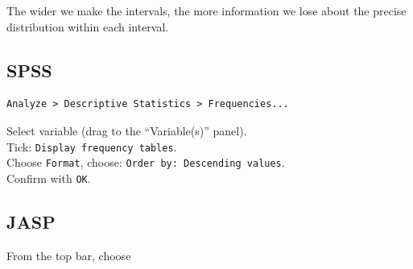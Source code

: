 \documentclass[
]{book}
\begin{document}
The wider we make the intervals, the more information we lose
about the precise distribution within each interval.

\hypertarget{spss-1}{%
\subsection{SPSS}\label{spss-1}}

\begin{verbatim}
Analyze > Descriptive Statistics > Frequencies...
\end{verbatim}

Select variable (drag to the ``Variable(s)'' panel).\\
Tick: \texttt{Display\ frequency\ tables}.\\
Choose \texttt{Format}, choose: \texttt{Order\ by:\ Descending\ values}.\\
Confirm with \texttt{OK}.\\

\hypertarget{jasp-1}{%
\subsection{JASP}\label{jasp-1}}

From the top bar, choose
\end{document}
